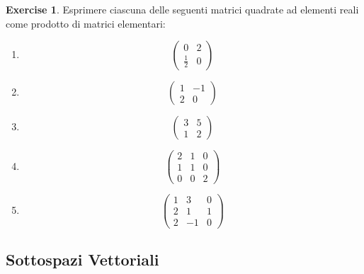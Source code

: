 \documentclass{article}
\theoremstyle{plain}
\theoremstyle{definition}
\newtheorem{xca}[exmp]{Exercise}
\theoremstyle{remark}
\begin{document}
\begin{bxthm}
\begin{xca}
    Esprimere ciascuna delle seguenti matrici quadrate ad elementi reali come prodotto di matrici elementari:
    \begin{multicols}{2}
    \begin{enumerate}
    \item \[\begin{pmatrix}
        0&2\\
        \frac{1}{2}&0
    \end{pmatrix}\]
    \item \[\begin{pmatrix}
        1&-1\\
        2&0
    \end{pmatrix}\]
    \item \[\begin{pmatrix}
        3&5\\
        1&2
    \end{pmatrix}\]
    \item \[\begin{pmatrix}
        2&1&0\\
        1&1&0\\
        0&0&2
    \end{pmatrix}\]
    \item \[\begin{pmatrix}
        1&3&0\\
        2&1&1\\
        2&-1&0
    \end{pmatrix}\]
    \end{enumerate}
\end{multicols}
\end{xca}
\end{bxthm}

\newpage
\subsection{Sottospazi Vettoriali}
\vspace{20pt}
\end{document}
